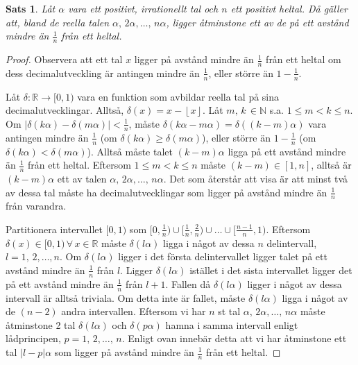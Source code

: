 \documentclass{article}
\newtheorem{theorem}{Sats}
\begin{document}
\begin{theorem}
	Låt $\alpha$ vara ett positivt, irrationellt tal och $n$ ett positivt heltal. Då gäller att, bland de reella talen $\alpha, \, 2\alpha, \ldots, \, n\alpha $, ligger åtminstone ett av de på ett avstånd mindre än $\frac{1}{n}$ från ett heltal.
\end{theorem}
\begin{proof}
	Observera att ett tal $x$ ligger på avstånd mindre än $\frac{1}{n}$ från ett heltal om dess decimalutveckling är antingen mindre än $\frac{1}{n}$, eller större än $1 - \frac{1}{n}$.
	
	Låt $\delta : \mathbb{R} \rightarrow [0,1)$ vara en funktion som avbildar reella tal på sina decimalutvecklingar. Alltså, $\delta\left( x \right) = x - \left\lfloor x \right\rfloor$. Låt $m,\, k\, \in \mathbb{N}$ s.a. $1 \leq m < k \leq n$. Om $\lvert\delta(k\alpha) - \delta(m\alpha)\rvert < \frac{1}{n}$, måste $\delta\left( k\alpha - m\alpha \right) = \delta\left( \left( k-m \right)\alpha \right)$ vara antingen mindre än $\frac{1}{n}$ (om $\delta(k\alpha) \geq \delta(m\alpha)$), eller större än $1-\frac{1}{n}$ (om $\delta(k\alpha) < \delta(m\alpha)$). Alltså måste talet $\left( k-m \right) \alpha $ ligga på ett avstånd mindre än $\frac{1}{n}$ från ett heltal. Eftersom $1 \leq m < k \leq n$ måste $\left( k-m \right) \in [1, n]$, alltså är $(k-m)\alpha$ ett av talen $\alpha, \, 2\alpha, \ldots, \, n\alpha$. Det som återstår att visa är att minst två av dessa tal måste ha decimalutvecklingar som ligger på avstånd mindre än $\frac{1}{n}$ från varandra.

	Partitionera intervallet $[0, 1)$ som $[0, \frac{1}{n}) \cup [\frac{1}{n}, \frac{2}{n}) \cup \ldots \cup [\frac{n-1}{n}, 1)$. Eftersom $\delta(x) \in [0, 1) \, \forall \, x \in \mathbb{R}$ måste $\delta(l\alpha)$ ligga i något av dessa $n$ delintervall, $l = 1, \, 2,\ldots, n$. Om $\delta(l\alpha)$ ligger i det första delintervallet ligger talet på ett avstånd mindre än $\frac{1}{n}$ från $l$. Ligger $\delta(l\alpha)$ istället i det sista intervallet ligger det på ett avstånd mindre än $\frac{1}{n}$ från $l + 1$. Fallen då $\delta(l\alpha)$ ligger i något av dessa intervall är alltså triviala. Om detta inte är fallet, måste $\delta(l\alpha)$ ligga i något av de $(n-2)$ andra intervallen. Eftersom vi har $n$ st tal $\alpha, \, 2\alpha, \ldots, \, n\alpha$ måste åtminstone 2 tal $\delta(l\alpha)$ och $\delta(p\alpha)$ hamna i samma intervall enligt lådprincipen, $p = 1, \, 2, \ldots, \, n$. Enligt ovan innebär detta att vi har åtminstone ett tal $\lvert l-p \rvert \alpha$ som ligger på avstånd mindre än $\frac{1}{n}$ från ett heltal.
\end{proof}
\end{document}
